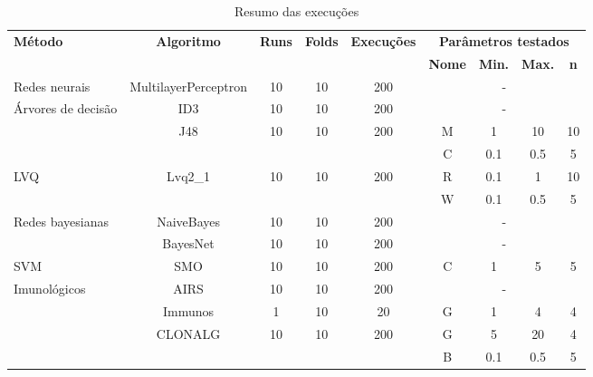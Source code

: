 \begin{table}[h]
    \vspace{0.5cm}
    \scriptsize
    \centering
    \caption{Resumo das execuções}
    \label{tbl:dev_exec_summary}
    \vspace{0.5cm}
    \begin{tabular}{|l|c|c|c|c|c|c|c|c|}
        \hline
        \multirow{2}{*}{\textbf{Método}} & \multirow{2}{*}{\textbf{Algoritmo}} & \multirow{2}{*}{\textbf{Runs}} & \multirow{2}{*}{\textbf{Folds}} & \multirow{2}{*}{\textbf{Execuções}} & \multicolumn{4}{c|}{\textbf{Parâmetros testados}} \\
        \cline{6-9}
        & & & & & \textbf{Nome} & \textbf{Min.} & \textbf{Max.} & \textbf{n} \\
        \hline
        Redes neurais & MultilayerPerceptron & 10 & 10 & 200 & \multicolumn{4}{c|}{-} \\
        \hline
        \multirow{3}{*}{Árvores de decisão} & ID3 & 10 & 10 & 200 & \multicolumn{4}{c|}{-} \\
        \cline{2-9}
        & \multirow{2}{*}{J48} & \multirow{2}{*}{10} & \multirow{2}{*}{10} & \multirow{2}{*}{200} & M & 1 & 10 & 10 \\
        \cline{6-9}
        & & & & & C & 0.1 & 0.5 & 5 \\
        \hline
        \multirow{2}{*}{LVQ} & \multirow{2}{*}{Lvq2\_1} & \multirow{2}{*}{10} & \multirow{2}{*}{10} & \multirow{2}{*}{200} & R & 0.1 & 1 & 10 \\
        \cline{6-9}
        & & & & & W & 0.1 & 0.5 & 5 \\
        \hline
        \multirow{2}{*}{Redes bayesianas} & NaiveBayes & 10 & 10 & 200 & \multicolumn{4}{c|}{-} \\
        \cline{2-9}
        & BayesNet & 10 & 10 & 200 & \multicolumn{4}{c|}{-} \\
        \hline
        SVM & SMO & 10 & 10 & 200 & C & 1 & 5 & 5 \\
        \hline
        \multirow{4}{*}{Imunológicos} & AIRS & 10 & 10 & 200 & \multicolumn{4}{c|}{-} \\
        \cline{2-9}
        & Immunos & 1 & 10 & 20 & G & 1 & 4 & 4 \\
        \cline{2-9}
        & \multirow{2}{*}{CLONALG} & \multirow{2}{*}{10} & \multirow{2}{*}{10} & \multirow{2}{*}{200} & G & 5 & 20 & 4 \\
        \cline{6-9}
        & & & & & B & 0.1 & 0.5 & 5 \\
        \hline
    \end{tabular}
    \vspace{0.5cm}
\end{table}

